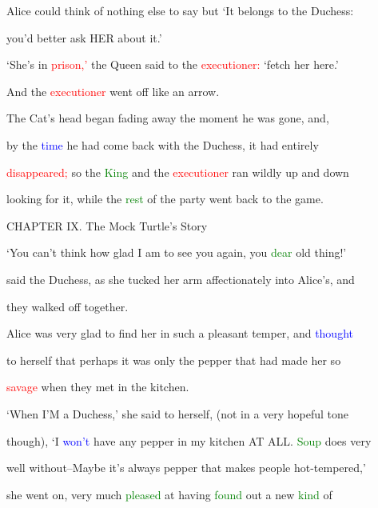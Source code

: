  Alice could think of nothing else to say but ‘It belongs to the Duchess:

 you’d better ask HER about it.’



 ‘She’s in \textcolor{red}{prison,’} the Queen said to the \textcolor{red}{executioner:} ‘fetch her here.’

 And the \textcolor{red}{executioner} went off like an arrow.



 The Cat’s head began fading away the moment he was gone, and,

 by the \textcolor{blue}{time} he had come back with the Duchess, it had entirely

 \textcolor{red}{disappeared;} so the \textcolor{green}{King} and the \textcolor{red}{executioner} ran wildly up and down

 looking for it, while the \textcolor{green}{rest} of the party went back to the game.









 CHAPTER IX. The Mock Turtle’s Story



 ‘You can’t think how \textcolor{BurntOrange}{glad} I am to see you again, you \textcolor{green}{dear} old thing!’

 said the Duchess, as she tucked her arm affectionately into Alice’s, and

 they walked off together.



 Alice was very \textcolor{BurntOrange}{glad} to find her in such a \textcolor{BurntOrange}{pleasant} temper, and \textcolor{blue}{thought}

 to herself that perhaps it was only the pepper that had made her so

 \textcolor{red}{savage} when they met in the kitchen.



 ‘When I’M a Duchess,’ she said to herself, (not in a very \textcolor{BurntOrange}{hopeful} tone

 though), ‘I \textcolor{blue}{won’t} have any pepper in my kitchen AT ALL. \textcolor{green}{Soup} does very

 well without--Maybe it’s always pepper that makes people hot-tempered,’

 she went on, very much \textcolor{green}{pleased} at having \textcolor{green}{found} out a new \textcolor{green}{kind} of

